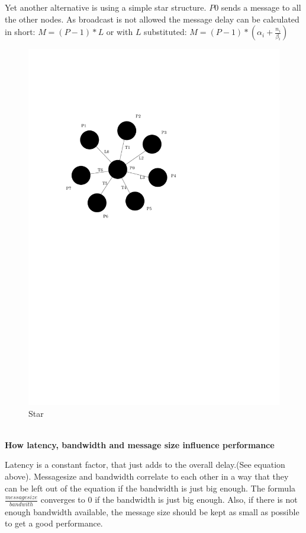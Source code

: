 \documentclass[a4paper,twoside,11pt]{article}
\begin{document}
Yet another alternative is using a simple star structure.
$P0$ sends a message to all the other nodes.
As broadcast is not allowed the message delay can be calculated in short: $M = (P-1)*L$ or with $L$ substituted: $M = (P-1) * (\alpha_i + \frac{n_i}{\beta_i})$
\begin{figure}[!htbp]
    \begin{center}
        \includegraphics[scale=1]{3c_3.pdf}
    \end{center}
    \caption{Star}
    \label{Star}
\end{figure}



$ $ \\
\textbf{How latency, bandwidth and message size influence performance}

\hspace{1em}Latency is a constant factor, that just adds to the overall delay.(See equation above). Messagesize and bandwidth correlate to each other in a way that they can be left out of the equation if the bandwidth is just big enough.
The formula $\frac{messagesize}{bandwith}$ converges to 0 if the bandwidth is just big enough. Also, if there is not enough bandwidth available, the message size should be kept as small as possible to get a good performance.
\end{document}
